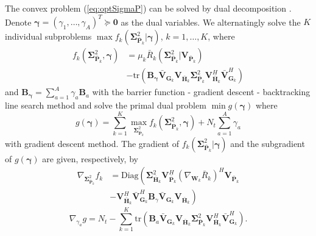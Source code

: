 \documentclass{article}
\begin{document}
    The convex problem (\ref{eq:optSigmaP}) can be solved by dual decomposition \cite{zhang2010cooperative, palomar2006tutorial}. Denote $\bm{\gamma}=(\gamma_1,\ldots,\gamma_A)^T\succeq \mathbf{0}$ as the dual variables. We alternatingly solve the $K$ individual subproblems $\max f_k(\mathbf{\Sigma}_{\bar{\mathbf{P}}_k}^2|\bm{\gamma})$, $k=1,\ldots,K$, where
    \begin{equation}
        \label{eq:fk}
        \begin{aligned}
            f_k(\mathbf{\Sigma}_{\bar{\mathbf{P}}_k}^2, \bm{\gamma}) & = \mu_k\bar{R}_k(\mathbf{\Sigma}_{\bar{\mathbf{P}}_k}^2|\mathbf{V}_{\bar{\mathbf{P}}_k}) \\
            & - \mbox{tr}(\mathbf{B}_{\bm{\gamma}}\bar{\mathbf{V}}_{\mathbf{G}_k}\mathbf{V}_{\bar{\mathbf{H}}_k}\mathbf{\Sigma}_{\bar{\mathbf{P}}_k}^2\mathbf{V}_{\bar{\mathbf{H}}_k}^H\bar{\mathbf{V}}_{\mathbf{G}_k}^H)
        \end{aligned}
    \end{equation}
    and $\mathbf{B}_{\bm{\gamma}} = \sum_{a=1}^A\gamma_a\mathbf{B}_a$ with the barrier function - gradient descent - backtracking line search method \cite{zeng2012linearrelay, boyd2004convex} and solve the primal dual problem $\min g(\bm{\gamma})$ where
    \begin{equation}
        \label{eq:g}
        g(\bm{\gamma}) = \sum_{k=1}^K\max_{\mathbf{\Sigma}_{\bar{\mathbf{P}}_k}^2}f_k(\mathbf{\Sigma}_{\bar{\mathbf{P}}_k}^2, \bm{\gamma}) + N_t\sum_{a=1}^A\gamma_a
    \end{equation}
    with gradient descent method. The gradient of $f_k(\mathbf{\Sigma}_{\bar{\mathbf{P}}_k}^2|\bm{\gamma})$ and the subgradient of $g(\bm{\gamma})$ are given,
    respectively,  by
    \begin{equation}
        \label{eq:gradSigmaBDAGDP}
        \begin{aligned}
            \nabla_{\mathbf{\Sigma}_{\bar{\mathbf{P}}_k}^2}f_k & = \mbox{Diag}\left(\mathbf{\Sigma}_{\bar{\mathbf{H}}_k}^2\mathbf{V}_{\bar{\mathbf{P}}_k}^H(\nabla_{\mathbf{W}_k} \bar{R}_k)^H\mathbf{V}_{\bar{\mathbf{P}}_k}\right. \\
            &-\left.\mathbf{V}_{\bar{\mathbf{H}}_k}^H\bar{\mathbf{V}}_{\mathbf{G}_k}^H\mathbf{B}_\gamma\bar{\mathbf{V}}_{\mathbf{G}_k}\mathbf{V}_{\bar{\mathbf{H}}_k}\right)
        \end{aligned}
    \end{equation}
    \begin{equation}
        \label{eq:gradgBDAGDP}
        \nabla_{\gamma_a}g=N_t - \sum_{k=1}^K\mbox{tr}(\mathbf{B}_a\bar{\mathbf{V}}_{\mathbf{G}_k}\mathbf{V}_{\bar{\mathbf{H}}_k}\mathbf{\Sigma}_{\bar{\mathbf{P}}_k}^2\mathbf{V}_{\bar{\mathbf{H}}_k}^H\bar{\mathbf{V}}_{\mathbf{G}_k}^H).
    \end{equation}
\end{document}
